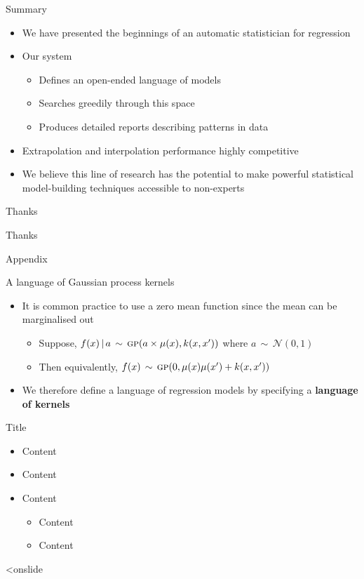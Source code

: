 \begin{frame}{Summary}
  \begin{itemize}
    \item We have presented the beginnings of an automatic statistician for regression
    \vspace{\baselineskip}
    \item Our system
    \begin{itemize}
      \item Defines an open-ended language of models
      \item Searches greedily through this space
      \item Produces detailed reports describing patterns in data
    \end{itemize}
    \vspace{\baselineskip}
    \item Extrapolation and interpolation performance highly competitive
    \vspace{\baselineskip}
    \item We believe this line of research has the potential to make powerful statistical model-building techniques accessible to non-experts
  \end{itemize}
\end{frame}

\begin{frame}{Thanks}
  \begin{center}
  \Huge
  Thanks
  \end{center}
\end{frame}

\begin{frame}{Appendix}
\end{frame}

\begin{frame}{A language of Gaussian process kernels}
  \begin{itemize}
    \item It is common practice to use a zero mean function since the mean can be marginalised out
  \begin{itemize}
    \item Suppose, ${f(x) \,|\, a \,\sim\, {\textsc{gp}}{}(a \times \mu(x), k(x,x'))}$ where $a \,\sim\, \mathcal{N}(0,1)$
    \item Then equivalently, $f(x) \,\sim\, {\textsc{gp}}{}(0, \mu(x)\mu(x') + k(x,x'))$
  \end{itemize}
  \vspace{\baselineskip}
  \item We therefore define a language of \gp{} regression models by
specifying a {\bf language of kernels}
  \end{itemize}
\end{frame}



\begin{frame}{Title}
  \begin{itemize}
    \item Content
    \vspace{\baselineskip}
    \item Content
    \vspace{\baselineskip}
    \item Content
    \begin{itemize}
       \item Content
       \item Content
     \end{itemize}
  \end{itemize}
\end{frame}  <onslide
